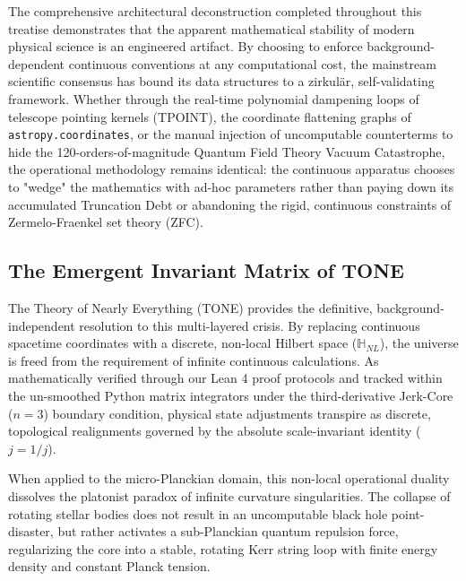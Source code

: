 \documentclass[11pt,a4paper]{article}
\theoremstyle{plain}
\theoremstyle{definition}
\begin{document}
The comprehensive architectural deconstruction completed throughout this treatise demonstrates that the apparent mathematical stability of modern physical science is an engineered artifact. By choosing to enforce background-dependent continuous conventions at any computational cost, the mainstream scientific consensus has bound its data structures to a zirkulär, self-validating framework. Whether through the real-time polynomial dampening loops of telescope pointing kernels (TPOINT), the coordinate flattening graphs of \texttt{astropy.coordinates}, or the manual injection of uncomputable counterterms to hide the 120-orders-of-magnitude Quantum Field Theory Vacuum Catastrophe, the operational methodology remains identical: the continuous apparatus chooses to "wedge" the mathematics with ad-hoc parameters rather than paying down its accumulated Truncation Debt or abandoning the rigid, continuous constraints of Zermelo-Fraenkel set theory (ZFC).

\subsection{The Emergent Invariant Matrix of TONE}
The Theory of Nearly Everything (TONE) provides the definitive, background-independent resolution to this multi-layered crisis. By replacing continuous spacetime coordinates with a discrete, non-local Hilbert space ($\mathbb{H}_{NL}$), the universe is freed from the requirement of infinite continuous calculations. As mathematically verified through our Lean 4 proof protocols and tracked within the un-smoothed Python matrix integrators under the third-derivative Jerk-Core ($n=3$) boundary condition, physical state adjustments transpire as discrete, topological realignments governed by the absolute scale-invariant identity ($j = 1/j$). 

When applied to the micro-Planckian domain, this non-local operational duality dissolves the platonist paradox of infinite curvature singularities. The collapse of rotating stellar bodies does not result in an uncomputable black hole point-disaster, but rather activates a sub-Planckian quantum repulsion force, regularizing the core into a stable, rotating Kerr string loop with finite energy density and constant Planck tension.
\end{document}
